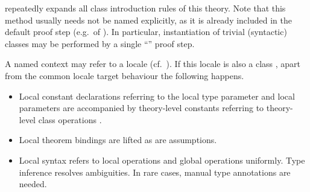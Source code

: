 \begin{isabellebody}
\begin{isamarkuptext}
\begin{descr}
  \item [\hyperlink{method.intro_classes}{\mbox{\isa{intro{\isacharunderscore}classes}}}] repeatedly expands all class
  introduction rules of this theory.  Note that this method usually
  needs not be named explicitly, as it is already included in the
  default proof step (e.g.\ of \hyperlink{command.proof}{\mbox{}}).  In particular,
  instantiation of trivial (syntactic) classes may be performed by a
  single ``\hyperlink{command.ddot}{\mbox{\isa{\isacommand{{\isachardot}{\isachardot}}}}}'' proof step.

  \end{descr}%
\end{isamarkuptext}%
\isamarkuptrue%
%
\isamarkuptrue%
%
\begin{isamarkuptext}%

  A named context may refer to a locale (cf.\ ).
  If this locale is also a class , apart from the common
  locale target behaviour the following happens.

  \begin{itemize}

  \item Local constant declarations  referring to the
  local type parameter \isa{{\isasymalpha}} and local parameters 
  are accompanied by theory-level constants 
  referring to theory-level class operations .

  \item Local theorem bindings are lifted as are assumptions.

  \item Local syntax refers to local operations  and
  global operations  uniformly.  Type inference
  resolves ambiguities.  In rare cases, manual type annotations are
  needed.
  

\end{itemize}
\end{isamarkuptext}
\end{isabellebody}
